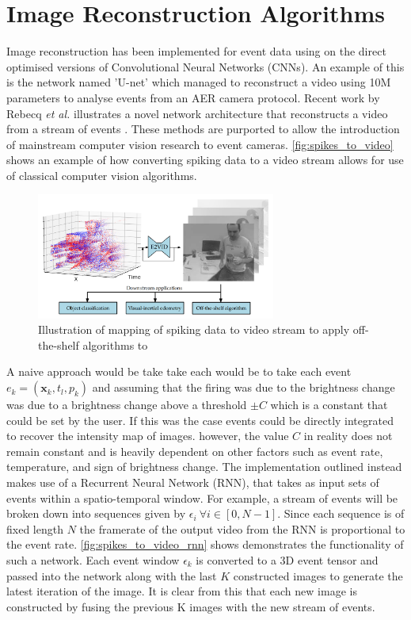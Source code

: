 \section{Image Reconstruction Algorithms}

Image reconstruction has been implemented for event data using on the direct optimised versions of Convolutional Neural Networks (CNNs). An example of this is the network named 'U-net'\cite{UNET} which managed to reconstruct a video using 10M parameters to analyse events from an AER camera protocol. Recent work by Rebecq \textit{et al.} illustrates a novel network architecture that reconstructs a video from a stream of events \cite{spikingToVideo}. These methods are purported to allow the introduction of mainstream computer vision research to event cameras. \autoref{fig:spikes_to_video} shows an example of how converting spiking data to a video stream allows for use of classical computer vision algorithms.

\begin{figure}[htb]
      \centering
      \includegraphics[width=0.7\textwidth]{background/images/spikes_to_video.png}
      \caption{Illustration of mapping of spiking data to video stream to apply off-the-shelf algorithms to\cite{spikingToVideo}}
      \label{fig:spikes_to_video}
\end{figure}

A naive approach would be take take each would be to take each event $ e_k = (\boldsymbol{\mathbf{x}}_k, t_l, p_k ) $ and assuming that the firing was due to the brightness change was due to a brightness change above a threshold $ \pm C $ which is a constant that could be set by the user. If this was the case events could be directly integrated to recover the intensity map of images. however, the value $ C $ in reality does not remain constant and is heavily dependent on other factors such as event rate, temperature, and sign of brightness change. The implementation outlined instead makes use of a Recurrent Neural Network (RNN), that takes as input sets of events within a spatio-temporal window. For example, a stream of events will be broken down into sequences given by $ \epsilon_i \: \forall i \in [0, N-1] $. Since each sequence is of fixed length $ N $ the framerate of the output video from the RNN is proportional to the event rate. \autoref{fig:spikes_to_video_rnn} shows demonstrates the functionality of such a network. Each event window $ \epsilon_k $ is converted to a 3D event tensor and passed into the network along with the last $ K $ constructed images to generate the latest iteration of the image. It is clear from this that each new image is constructed by fusing the previous K images with the new stream of events.

